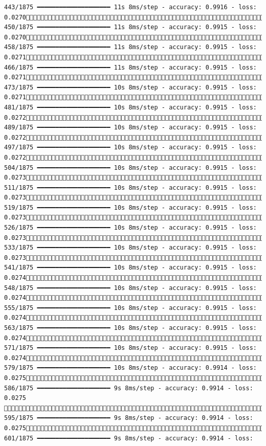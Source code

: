 \documentclass[
  letterpaper,
  DIV=11,
  numbers=noendperiod]{scrreprt}
\begin{document}
\begin{verbatim}
443/1875 ━━━━━━━━━━━━━━━━━━━━ 11s 8ms/step - accuracy: 0.9916 - loss: 0.0270 450/1875 ━━━━━━━━━━━━━━━━━━━━ 11s 8ms/step - accuracy: 0.9915 - loss: 0.0270 458/1875 ━━━━━━━━━━━━━━━━━━━━ 11s 8ms/step - accuracy: 0.9915 - loss: 0.0271 466/1875 ━━━━━━━━━━━━━━━━━━━━ 11s 8ms/step - accuracy: 0.9915 - loss: 0.0271 473/1875 ━━━━━━━━━━━━━━━━━━━━ 10s 8ms/step - accuracy: 0.9915 - loss: 0.0271 481/1875 ━━━━━━━━━━━━━━━━━━━━ 10s 8ms/step - accuracy: 0.9915 - loss: 0.0272 489/1875 ━━━━━━━━━━━━━━━━━━━━ 10s 8ms/step - accuracy: 0.9915 - loss: 0.0272 497/1875 ━━━━━━━━━━━━━━━━━━━━ 10s 8ms/step - accuracy: 0.9915 - loss: 0.0272 504/1875 ━━━━━━━━━━━━━━━━━━━━ 10s 8ms/step - accuracy: 0.9915 - loss: 0.0273 511/1875 ━━━━━━━━━━━━━━━━━━━━ 10s 8ms/step - accuracy: 0.9915 - loss: 0.0273 519/1875 ━━━━━━━━━━━━━━━━━━━━ 10s 8ms/step - accuracy: 0.9915 - loss: 0.0273 526/1875 ━━━━━━━━━━━━━━━━━━━━ 10s 8ms/step - accuracy: 0.9915 - loss: 0.0273 533/1875 ━━━━━━━━━━━━━━━━━━━━ 10s 8ms/step - accuracy: 0.9915 - loss: 0.0273 541/1875 ━━━━━━━━━━━━━━━━━━━━ 10s 8ms/step - accuracy: 0.9915 - loss: 0.0274 548/1875 ━━━━━━━━━━━━━━━━━━━━ 10s 8ms/step - accuracy: 0.9915 - loss: 0.0274 555/1875 ━━━━━━━━━━━━━━━━━━━━ 10s 8ms/step - accuracy: 0.9915 - loss: 0.0274 563/1875 ━━━━━━━━━━━━━━━━━━━━ 10s 8ms/step - accuracy: 0.9915 - loss: 0.0274 571/1875 ━━━━━━━━━━━━━━━━━━━━ 10s 8ms/step - accuracy: 0.9915 - loss: 0.0274 579/1875 ━━━━━━━━━━━━━━━━━━━━ 10s 8ms/step - accuracy: 0.9914 - loss: 0.0275 586/1875 ━━━━━━━━━━━━━━━━━━━━ 9s 8ms/step - accuracy: 0.9914 - loss: 0.0275  595/1875 ━━━━━━━━━━━━━━━━━━━━ 9s 8ms/step - accuracy: 0.9914 - loss: 0.0275 601/1875 ━━━━━━━━━━━━━━━━━━━━ 9s 8ms/step - accuracy: 0.9914 - loss: 
\end{verbatim}
\end{document}
